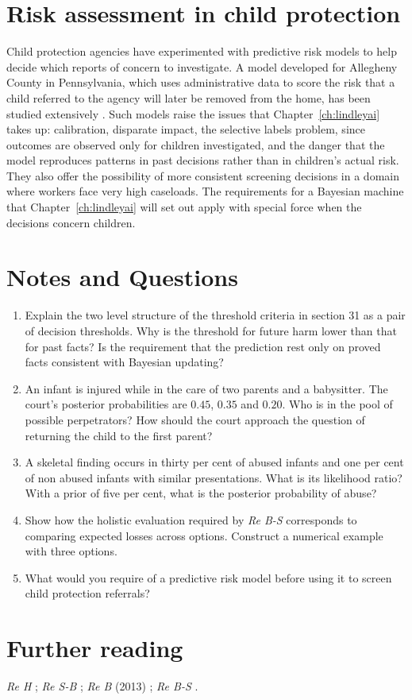 \section{Risk assessment in child protection}

Child protection agencies have experimented with predictive risk models to help decide which reports of concern to investigate. A model developed for Allegheny County in Pennsylvania, which uses administrative data to score the risk that a child referred to the agency will later be removed from the home, has been studied extensively \citep{chouldechova2018,eubanks2018}. Such models raise the issues that Chapter~\ref{ch:lindleyai} takes up: calibration, disparate impact, the selective labels problem, since outcomes are observed only for children investigated, and the danger that the model reproduces patterns in past decisions rather than in children's actual risk. They also offer the possibility of more consistent screening decisions in a domain where workers face very high caseloads. The requirements for a Bayesian machine that Chapter~\ref{ch:lindleyai} will set out apply with special force when the decisions concern children.

\section*{Notes and Questions}
\begin{enumerate}[label=\arabic*.]
\item Explain the two level structure of the threshold criteria in section 31 as a pair of decision thresholds. Why is the threshold for future harm lower than that for past facts? Is the requirement that the prediction rest only on proved facts consistent with Bayesian updating?
\item An infant is injured while in the care of two parents and a babysitter. The court's posterior probabilities are $0.45$, $0.35$ and $0.20$. Who is in the pool of possible perpetrators? How should the court approach the question of returning the child to the first parent?
\item A skeletal finding occurs in thirty per cent of abused infants and one per cent of non abused infants with similar presentations. What is its likelihood ratio? With a prior of five per cent, what is the posterior probability of abuse?
\item Show how the holistic evaluation required by \emph{Re B-S} corresponds to comparing expected losses across options. Construct a numerical example with three options.
\item What would you require of a predictive risk model before using it to screen child protection referrals?
\end{enumerate}

\section*{Further reading}
\emph{Re H} \citep{reh1996}; \emph{Re S-B} \citep{resb2009}; \emph{Re B} (2013) \citep{reb2013}; \emph{Re B-S} \citep{rebs2013}.
